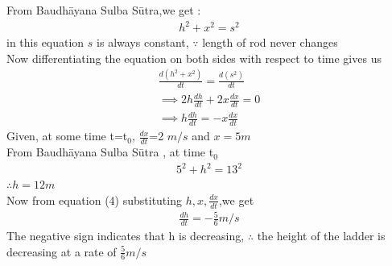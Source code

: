 \documentclass[journal,12pt,twocolumn]{IEEEtran}
\begin{document}
From Baudhāyana Sulba Sūtra,we get :
\begin{align}
h^2+x^2=s^2
\end{align}
in this equation $s$ is always constant,
 $\because$ length of rod never changes\\
 Now differentiating the equation on both sides with respect to time gives us\\
 \begin{align}
 \frac{d(h^2+x^2)}{dt}=\frac{d(s^2)}{dt}\\
  \implies 2h\frac{dh}{dt}+2x\frac{dx}{dt}=0\\
 \implies h\frac{dh}{dt}=-x\frac{dx}{dt}
 \end{align}
 Given, at some time t=t$_0$,
  $\frac{dx}{dt}$=2 $m/s$ and $x= 5 m$\\
  From Baudhāyana Sulba Sūtra , at time t$_0$
  \begin{align}
  5^2+h^2=13^2
  \end{align}
  $\therefore h= 12 m$\\
  Now from equation (4) substituting $h,x,\frac{dx}{dt}$,we get\\
  \begin{align}
   \frac{dh}{dt}=-\frac{5}{6} m/s
\end{align}  
The negative sign indicates that h is decreasing,
$\therefore$ the height of the ladder is decreasing at a rate of $\frac{5}{6} m/s$
\end{document}
